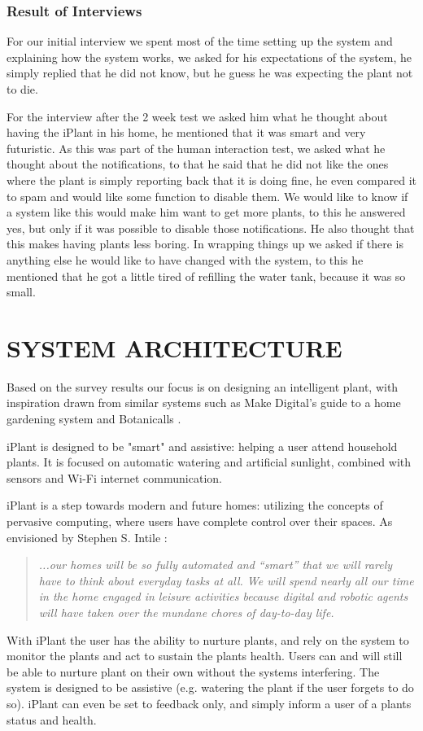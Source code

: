 \documentclass{ubicomp2012}
\begin{document}
\subsubsection{Result of Interviews}
For our initial interview we spent most of the time setting up the system and explaining how the system works, we asked for his expectations of the system, he simply replied that he did not know, but he guess he was expecting the plant not to die.

For the interview after the 2 week test we asked him what he thought about having the iPlant in his home, he mentioned that it was smart and very futuristic. As this was part of the human interaction test, we asked what he thought about the notifications, to that he said that he did not like the ones where the plant is simply reporting back that it is doing fine, he even compared it to spam and would like some function to disable them. We would like to know if a system like this would make him want to get more plants, to this he answered yes, but only if it was possible to disable those notifications. He also thought that this makes having plants less boring. In wrapping things up we asked if there is anything else he would like to have changed with the system, to this he mentioned that he got a little tired of refilling the water tank, because it was so small.


\section{SYSTEM ARCHITECTURE}
Based on the survey results our focus is on designing an intelligent plant, with inspiration drawn from similar systems such as Make Digital's guide to a home gardening system \cite{how-to-make-a-gardening-system} and Botanicalls \cite{botanicalls}.

iPlant is designed to be "smart" and assistive: helping a user attend household plants. It is focused on automatic watering and artificial sunlight, combined with sensors and Wi-Fi internet communication.

iPlant is a step towards modern and future homes: utilizing the concepts of pervasive computing, where users have complete control over their spaces. As envisioned by Stephen S. Intile \cite{future-homes}: 
\begin{quotation} \em...our homes will be so fully automated and “smart” that we will rarely have to think about everyday tasks at all. We will spend nearly all our time in the home engaged in leisure activities because digital and robotic agents will have taken over the mundane chores of day-to-day life.
\end{quotation}
With iPlant the user has the ability to nurture plants, and rely on the system to monitor the plants and act to sustain the plants health. Users can and will still be able to nurture plant on their own without the systems interfering. The system is designed to be assistive (e.g. watering the plant if the user forgets to do so). iPlant can even be set to feedback only, and simply inform a user of a plants status and health.
\end{document}
